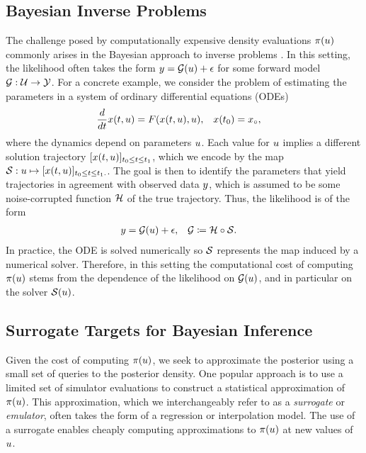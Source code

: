 \documentclass[12pt]{article}
\begin{document}
\subsection{Bayesian Inverse Problems} \label{sec:bip}
The challenge posed by computationally expensive density evaluations $\pi(u)$ commonly 
arises in the Bayesian approach to inverse problems \citep{Stuart_BIP}. In this setting, 
the likelihood often takes the form $y = \mathcal{G}(u) + \epsilon$ for some forward model
$\mathcal{G}: \mathcal{U} \to \mathcal{Y}$. For a concrete example, we consider the problem of estimating the 
parameters in a system of ordinary differential equations (ODEs)
\begin{align}
\frac{d}{dt} x(t, u) &= F(x(t, u), u), &&x(t_0) = x_{\circ}, \label{ode_ivp}
\end{align}
where the dynamics depend on parameters $u$. Each value for $u$ implies a different solution trajectory
$[x(t, u)]_{t_0 \leq t \leq t_1}$, which we encode by the
map $\mathcal{S}: u \mapsto [x(t, u)]_{t_0 \leq t \leq t_1.}$. The goal is then 
to identify the parameters that yield trajectories in agreement with observed data 
$y$, which is assumed to be some noise-corrupted function $\mathcal{H}$ of the true trajectory. Thus, the 
likelihood is of the form 
\begin{align}
&y = \mathcal{G}(u) + \epsilon, &&\mathcal{G} \coloneqq \mathcal{H} \circ \mathcal{S}. \label{eq:additive-noise}
\end{align}
In practice, the ODE is solved numerically so $\mathcal{S}$ represents the map induced by a numerical 
solver. Therefore, in this setting the computational cost of computing $\pi(u)$ stems from the 
dependence of the likelihood on $\mathcal{G}(u)$, and in particular on the solver $\mathcal{S}(u)$.

\subsection{Surrogate Targets for Bayesian Inference} \label{sec:surrogates-Bayes}
Given the cost of computing $\pi(u)$, we seek to approximate
the posterior using a small set of queries to the posterior density. 
One popular approach is to use a limited set of simulator evaluations to 
construct a statistical approximation of $\pi(u)$. This approximation,
which we interchangeably refer to as a \textit{surrogate} or \textit{emulator},
often takes the form of a regression or interpolation model. The use of a surrogate
enables cheaply computing approximations to $\pi(u)$ at new values 
of $u$.
\end{document}
